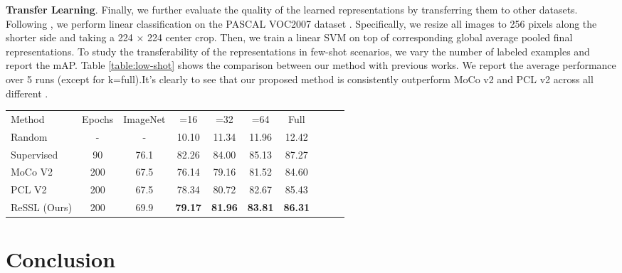 \documentclass{article}
\newcommand{\<}{\left\langle}
\renewcommand{\>}{\right\rangle}
\begin{document}
\vspace{-5pt}
\textbf{Transfer Learning}. 
Finally, we further evaluate the quality of the learned representations by transferring them to other datasets. Following \cite{PCL}, we perform linear classification on the PASCAL VOC2007 dataset \cite{pascal-voc-2007}. Specifically, we resize all images to 256 pixels along the shorter side and taking a 224 × 224 center crop. Then, we train a linear SVM on top of corresponding global average pooled final representations. To study the transferability of the representations in few-shot scenarios, we vary the number of labeled examples  and report the mAP. Table \ref{table:low-shot} shows the comparison between our method with previous works. We report the average performance over 5 runs (except for k=full).It's clearly to see that our proposed method is consistently outperform MoCo v2 and PCL v2 across all different . 
\vspace{-5pt}

\renewcommand\arraystretch{1.15}
\begin{table*}[h]
 \centering
 \setlength\tabcolsep{7pt}
 \vspace{-8pt}
 \small
 \caption{Transfer learning on low-shot image classification}
 \label{table:low-shot}
\begin{tabular}{l  c c   c  c  c  c  c  c  c} 
\toprule 
Method & Epochs & ImageNet & =16 & =32 & =64 & Full \\
Random & -      & -        & 10.10  & 11.34 & 11.96 & 12.42  \\
Supervised & 90 & 76.1     & 82.26  & 84.00 & 85.13 & 87.27  \\ \hline
MoCo V2 \cite{mocov2} & 200 &  67.5 & 76.14 & 79.16 & 81.52 & 84.60   \\
PCL V2 \cite{PCL} & 200 &  67.5  & 78.34 & 80.72 & 82.67 & 85.43 \\
ReSSL (Ours)     & 200 & 69.9 & \textbf{79.17} & \textbf{81.96} & \textbf{83.81} & \textbf{86.31} \\
\toprule 
\end{tabular}
\vspace{-15pt}
\end{table*}



 \section{Conclusion}
\end{document}
